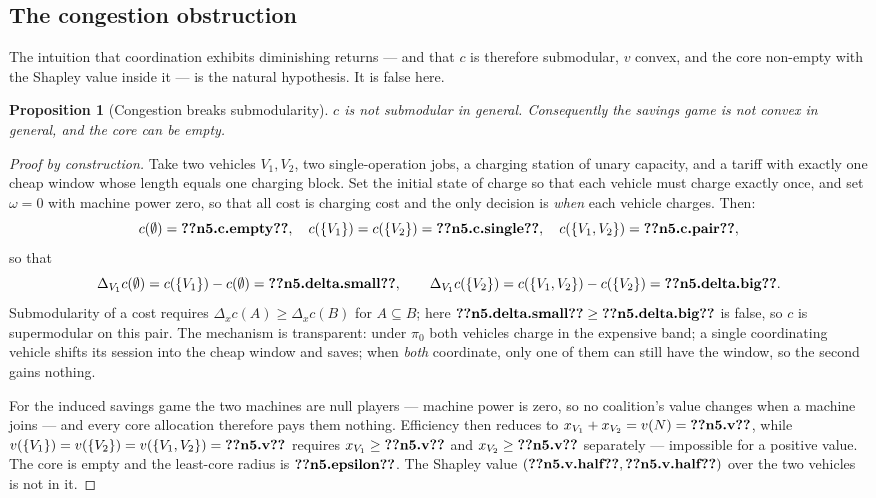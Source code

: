 \documentclass[preprint, 3p, review, 12pt]{elsarticle}
\newtheorem{proposition}[theorem]{Proposition}
\theoremstyle{definition}
\begin{document}
\subsection{The congestion obstruction}
\label{sec:n5}

The intuition that coordination exhibits diminishing returns --- and that $c$ is therefore
submodular, $v$ convex, and the core non-empty with the Shapley value inside it
\citep{shapley1971cores} --- is the natural hypothesis. It is false here.

\begin{proposition}[Congestion breaks submodularity]
\label{prop:n5}
$c$ is not submodular in general. Consequently the savings game is not convex in general,
and the core can be empty.
\end{proposition}

\begin{proof}[Proof by construction]
Take two vehicles $V_1,V_2$, two single-operation jobs, a charging station of unary capacity,
and a tariff with exactly one cheap window whose length equals one charging block. Set the
initial state of charge so that each vehicle must charge exactly once, and set
$\omega=0$ with machine power zero, so that all cost is charging cost and the only decision
is \emph{when} each vehicle charges. Then:
\[
c(\emptyset)=\jnum{n5.c.empty},\quad
c(\{V_1\})=c(\{V_2\})=\jnum{n5.c.single},\quad
c(\{V_1,V_2\})=\jnum{n5.c.pair},
\]
so that
\[
\Delta_{V_1}c(\emptyset) = c(\{V_1\})-c(\emptyset) = \jnum{n5.delta.small},
\qquad
\Delta_{V_1}c(\{V_2\}) = c(\{V_1,V_2\})-c(\{V_2\}) = \jnum{n5.delta.big}.
\]
Submodularity of a cost requires $\Delta_x c(A)\ge\Delta_x c(B)$ for $A\subseteq B$; here
$\jnum{n5.delta.small} \ge \jnum{n5.delta.big}$ is false, so $c$ is supermodular on this
pair. The mechanism is transparent: under $\pi_0$ both vehicles charge in the expensive band;
a single coordinating vehicle shifts its session into the cheap window and saves; when
\emph{both} coordinate, only one of them can still have the window, so the second gains
nothing.

For the induced savings game the two machines are null players --- machine power is zero,
so no coalition's value changes when a machine joins --- and every core allocation therefore
pays them nothing. Efficiency then reduces to $x_{V_1}+x_{V_2}=v(N)=\jnum{n5.v}$, while
$v(\{V_1\})=v(\{V_2\})=v(\{V_1,V_2\})=\jnum{n5.v}$ requires $x_{V_1}\ge\jnum{n5.v}$ and
$x_{V_2}\ge\jnum{n5.v}$ separately --- impossible for a positive value. The core is empty and
the least-core radius is $\jnum{n5.epsilon}$. The Shapley value
$(\jnum{n5.v.half},\jnum{n5.v.half})$ over the two vehicles is not in it.
\end{proof}
\end{document}
